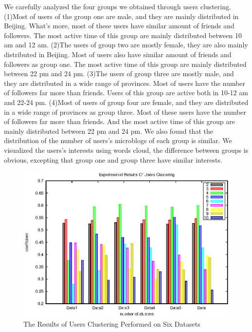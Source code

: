 We carefully analyzed the four groups we obtained through users clustering. (1)Most of users of the group one are male, and they are mainly distributed in Beijing. What's more, most of these users have similar amount of friends and followers. The most active time of this group are mainly distributed between 10 am and 12 am. (2)The users of group two are mostly female, they are also mainly distributed in Beijing. Most of users also have similar amount of friends and followers as group one. The most active time of this group are mainly distributed between 22 pm and 24 pm. (3)The users of group three are mostly male, and they are distributed in a wide range of provinces. Most of users have the number of followers far more than friends. Users of this group are active both in 10-12 am and 22-24 pm. (4)Most of users of group four are female, and they are distributed in a wide range of provinces as group three. Most of these users have the number of followers far more than friends. And the most active time of this group are mainly distributed between 22 pm and 24 pm. We also found that the distribution of the number of users's microblogs of each group is similar. We visualized the users's interests using words cloud, the difference between groups is obvious, excepting that group one and group three have similar interests.

\begin{figure}[!htb]
\centering
\includegraphics[width=.96\linewidth]{IMAGE/clustering/Clustering}
\caption{The Results of Users Clustering Performed on Six Datasets}
\label{fig:sample_clustering}
\end{figure}

